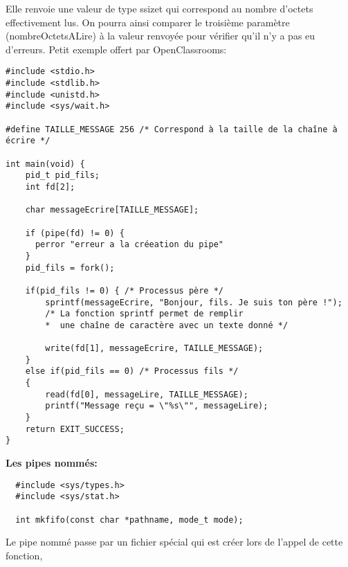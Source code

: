 \documentclass[a4paper]{article}
\begin{document}
Elle renvoie une valeur de type ssize\textunderscore{}t qui correspond au nombre d'octets effectivement lus. On pourra ainsi comparer le troisième paramètre (nombreOctetsALire) à la valeur renvoyée pour vérifier qu'il n'y a pas eu d'erreurs.\newpage
Petit exemple offert par OpenClassrooms:
\begin{lstlisting}
#include <stdio.h>
#include <stdlib.h>
#include <unistd.h>
#include <sys/wait.h>

#define TAILLE_MESSAGE 256 /* Correspond à la taille de la chaîne à écrire */

int main(void) {
    pid_t pid_fils;
    int fd[2];

    char messageEcrire[TAILLE_MESSAGE];

    if (pipe(fd) != 0) {
      perror "erreur a la créeation du pipe"
    }
    pid_fils = fork();

    if(pid_fils != 0) { /* Processus père */
        sprintf(messageEcrire, "Bonjour, fils. Je suis ton père !");
        /* La fonction sprintf permet de remplir
        *  une chaîne de caractère avec un texte donné */

        write(fd[1], messageEcrire, TAILLE_MESSAGE);
    }
    else if(pid_fils == 0) /* Processus fils */
    {
        read(fd[0], messageLire, TAILLE_MESSAGE);
        printf("Message reçu = \"%s\"", messageLire);
    }
    return EXIT_SUCCESS;
}
\end{lstlisting}
\textbf{Les pipes nommés:}
\begin{lstlisting}
  #include <sys/types.h>
  #include <sys/stat.h>

  int mkfifo(const char *pathname, mode_t mode);
\end{lstlisting}
Le pipe nommé passe par un fichier spécial qui est créer lors de l'appel de cette fonction,
\end{document}
